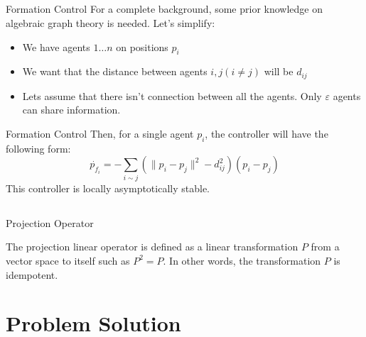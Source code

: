 \documentclass[t]{beamer}
\newcommand{\norm}[1]{\lVert #1 \rVert}
\begin{document}
\subsection[Distance-Based Formation Control]{}
\begin{frame}[label=distanceformation1]{Formation Control}
For a complete background, some prior knowledge on algebraic graph theory is needed. Let's simplify:
\begin{itemize}
\item<1-> We have agents $1 \ldots n$ on positions $p_{i}$
\item<2-> We want that the distance between agents $i,j (i \neq j)$ will be $d_{ij}$
\item<3-> Lets assume that there isn't connection between all the agents. Only $\varepsilon$ agents can share information.
\end{itemize}
\end{frame}

\begin{frame}[label=distanceformation2]{Formation Control}
Then, for a single agent $p_i$, the controller will have the following form:
\begin{equation}
    \dot{p_{f_{i}}} = -\sum_{i \sim j} \left( \norm{p_{i} - p_{j}}^{2} - d_{ij}^2 \right) \left( p_{i} - p_{j} \right)
    \label{formation controller}
\end{equation}
This controller is locally asymptotically stable.
\end{frame}

\subsection[Projection Operator]{}
\begin{frame}[label=projoperator]{Projection Operator}

The projection linear operator is defined as a linear transformation $P$ from a vector space to itself such as $P^2 = P$. In other words, the transformation $P$ is idempotent.

\end{frame}


\section[Problem Solution]{Problem Solution}
\end{document}
